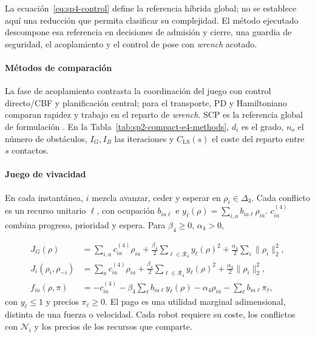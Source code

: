 La ecuación~\eqref{eq:sp4-control} define la referencia híbrida global; no se establece aquí una reducción que permita clasificar su complejidad. El método ejecutado descompone esa referencia en decisiones de admisión y cierre, una guardia de seguridad, el acoplamiento y el control de pose con \emph{wrench} acotado.

\paragraph{Métodos de comparación}

La fase de acoplamiento contrasta la coordinación del juego con control directo/CBF y planificación central; para el transporte, PD y Hamiltoniano comparan rapidez y trabajo en el reparto de \emph{wrench}. SCP es la referencia global de formulación \parencite{alonsomora2017transport}. En la Tabla~\ref{tab:sp2-compact-e4-methods}, $d_i$ es el grado, $n_o$ el número de obstáculos, $I_G,I_B$ las iteraciones y $C_{\mathrm{LS}}(s)$ el coste del reparto entre $s$ contactos.


\paragraph{Juego de vivacidad}

En cada instantánea, $i$ mezcla avanzar, ceder y esperar en $\rho_i\in\Delta_3$. Cada conflicto es un recurso unitario $\ell$, con ocupación $b_{ia\ell}$ e $y_\ell(\rho)=\sum_{i,a}b_{ia\ell}\rho_{ia}$. $c_{ia}^{(4)}$ combina progreso, prioridad y espera. Para $\beta_4\geq0$, $\alpha_4>0$,

\begin{align}
 J_G(\rho)
 &=\sum_{i,a}c_{ia}^{(4)}\rho_{ia}
 +\frac{\beta_4}{2}\sum_{\ell\in\mathcal R_4}y_\ell(\rho)^2
 +\frac{\alpha_4}{2}\sum_i\|\rho_i\|_2^2,
 \label{eq:sp4-game-potential}\\
 J_i(\rho_i,\rho_{-i})
 &=\sum_a c_{ia}^{(4)}\rho_{ia}
 +\frac{\beta_4}{2}\sum_{\ell\in\mathcal R_4}y_\ell(\rho)^2
 +\frac{\alpha_4}{2}\|\rho_i\|_2^2,
 \label{eq:sp4-player-cost}\\
 f_{ia}(\rho,\pi)
 &=-c_{ia}^{(4)}-\beta_4\sum_\ell b_{ia\ell}y_\ell(\rho)
   -\alpha_4\rho_{ia}-\sum_\ell b_{ia\ell}\pi_\ell,
 \label{eq:sp4-payoff}
\end{align}
con $y_\ell\leq1$ y precios $\pi_\ell\geq0$. El pago es una utilidad marginal adimensional, distinta de una fuerza o velocidad. Cada robot requiere su coste, los conflictos con $\mathcal N_i$ y los precios de los recursos que comparte.

